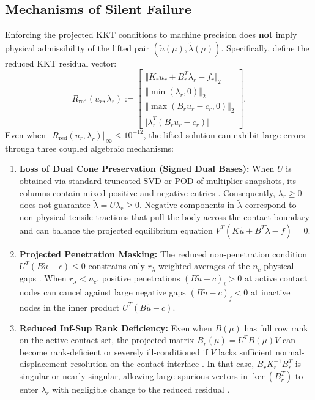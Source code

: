 \documentclass[11pt,a4paper]{article}
\providecommand{\tightlist}{\setlength{\itemsep}{0pt}\setlength{\parskip}{0pt}}
\begin{document}
\hypertarget{mechanisms-of-silent-reduced-kkt-failure}{%
\subsection{Mechanisms of Silent Failure}\label{mechanisms-of-silent-reduced-kkt-failure}}

Enforcing the projected KKT conditions to machine precision does \textbf{not} imply physical admissibility of the lifted pair \((\tilde{u}(\mu), \tilde{\lambda}(\mu))\). Specifically, define the reduced KKT residual vector:
\begin{equation}\label{eq:resid}R_{\text{red}}(u_r, \lambda_r) := \begin{bmatrix}
\Vert K_r u_r + B_r^T \lambda_r - f_r \Vert_2 \\
\Vert \min(\lambda_r, 0) \Vert_2 \\
\Vert \max(B_r u_r - c_r, 0) \Vert_2 \\
\vert \lambda_r^T (B_r u_r - c_r) \vert
\end{bmatrix}.\end{equation}
Even when \(\Vert R_{\text{red}}(u_r, \lambda_r) \Vert_\infty \le 10^{-12}\), the lifted solution can exhibit large errors through three coupled algebraic mechanisms:

\begin{enumerate}
\def\labelenumi{\arabic{enumi}.}
\tightlist
\item
  \textbf{Loss of Dual Cone Preservation (Signed Dual Bases):}
  When \(U\) is obtained via standard truncated SVD or POD of multiplier snapshots, its columns contain mixed positive and negative entries \cite{balajewicz2016projection, benaceur2020reduced}. Consequently, \(\lambda_r \ge 0\) does not guarantee \(\tilde{\lambda} = U \lambda_r \ge 0\). Negative components in \(\tilde{\lambda}\) correspond to non-physical tensile tractions that pull the body across the contact boundary and can balance the projected equilibrium equation \(V^T(K \tilde{u} + B^T \tilde{\lambda} - f) = 0\).
\item
  \textbf{Projected Penetration Masking:}
  The reduced non-penetration condition \(U^T (B \tilde{u} - c) \le 0\) constrains only \(r_\lambda\) weighted averages of the \(n_c\) physical gaps \cite{fauque2018hybrid, sambataro2026model}. When \(r_\lambda < n_c\), positive penetrations \((B \tilde{u} - c)_i > 0\) at active contact nodes can cancel against large negative gaps \((B \tilde{u} - c)_j < 0\) at inactive nodes in the inner product \(U^T(B\tilde{u} - c)\).
\item
  \textbf{Reduced Inf-Sup Rank Deficiency:}
  Even when \(B(\mu)\) has full row rank on the active contact set, the projected matrix \(B_r(\mu) = U^T B(\mu) V\) can become rank-deficient or severely ill-conditioned if \(V\) lacks sufficient normal-displacement resolution on the contact interface \cite{benaceur2020reduced, leberre2022condition}. In that case, \(B_r K_r^{-1} B_r^T\) is singular or nearly singular, allowing large spurious vectors in \(\ker(B_r^T)\) to enter \(\lambda_r\) with negligible change to the reduced residual \cite{leberre2022condition}.
\end{enumerate}
\end{document}

